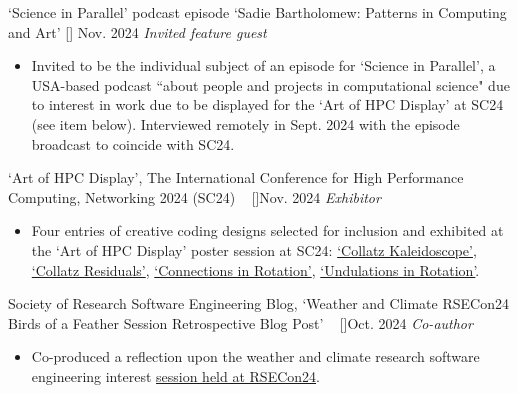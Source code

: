 \begin{talks}

\projecta
	{`Science in Parallel' podcast episode `Sadie Bartholomew: Patterns in Computing and Art' [\href{https://scienceinparallel.org/2024/11/sadie-bartholomew-patterns-in-computing-and-art/}{\small{\websiteSymbol}}]}{\hspace*{16cm} Nov. 2024}
	{
	    \textit{Invited feature guest}
	}
	{\begin{itemize}
     \item Invited to be the individual subject of an episode for `Science in Parallel', a USA-based podcast ``about people and projects in computational science" due to interest in work due to be displayed for the `Art of HPC Display' at SC24 (see item below). Interviewed remotely in Sept. 2024 with the episode broadcast to coincide with SC24.
     \end{itemize}}

\projecta
	{`Art of HPC Display', The International Conference for High Performance Computing, Networking 2024 (SC24) ~ [\href{https://sc24.conference-program.com/session/?sess=sess553}{\small{\websiteSymbol}}]}{Nov. 2024}
	{
	    \textit{Exhibitor}
	}
	{\begin{itemize}
     \item Four entries of creative coding designs selected for inclusion and exhibited at the `Art of HPC Display' poster session at SC24: \href{https://sc24.supercomputing.org/proceedings/art_of_hpc/art_of_hpc_pages/art115.html}{`Collatz Kaleidoscope'}, \href{https://sc24.supercomputing.org/proceedings/art_of_hpc/art_of_hpc_pages/art117.html}{`Collatz Residuals'}, \href{https://sc24.supercomputing.org/proceedings/art_of_hpc/art_of_hpc_pages/art131.html}{`Connections in Rotation'}, \href{https://sc24.supercomputing.org/proceedings/art_of_hpc/art_of_hpc_pages/art132.html}{`Undulations in Rotation'}.
     \end{itemize}}

\projecta
	{Society of Research Software Engineering Blog, `Weather and Climate RSECon24 Birds of a Feather Session
Retrospective Blog Post' ~ [\href{https://society-rse.org/weather-and-climate-rsecon24-birds-of-a-feather-session-retrospective-blog-post/}{\small{\websiteSymbol}}]}{Oct. 2024}
	{
	    \textit{Co-author}
	}
	{
    \begin{itemize}
     \item Co-produced a reflection upon the weather and climate research software engineering interest \href{https://docs.google.com/presentation/d/1EroCJEARScMQy9Sjqnuubzx4VeOEazJ9U4f8JuYnByo/edit#slide=id.p}{session held at RSECon24}.
     \end{itemize}
     }


\end{talks}
